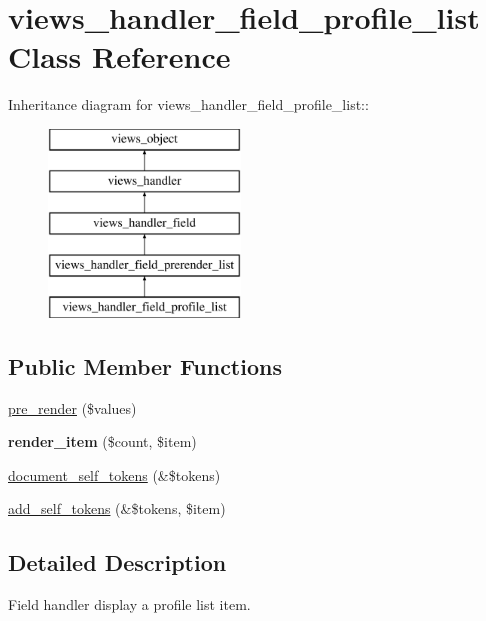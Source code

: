 \hypertarget{classviews__handler__field__profile__list}{
\section{views\_\-handler\_\-field\_\-profile\_\-list Class Reference}
\label{classviews__handler__field__profile__list}
}
Inheritance diagram for views\_\-handler\_\-field\_\-profile\_\-list::\begin{figure}[H]
\begin{center}
\leavevmode
\includegraphics[height=5cm]{classviews__handler__field__profile__list}
\end{center}
\end{figure}
\subsection*{Public Member Functions}
\begin{CompactItemize}
\item 
\hyperlink{classviews__handler__field__profile__list_8c8d3cb39336f354e35c0b2e5afd25aa}{pre\_\-render} (\$values)
\item 
\hypertarget{classviews__handler__field__profile__list_8099ba4762d6497c288efe46d804030b}{
\textbf{render\_\-item} (\$count, \$item)}
\label{classviews__handler__field__profile__list_8099ba4762d6497c288efe46d804030b}

\item 
\hyperlink{classviews__handler__field__profile__list_b3950ce980ce3c8e8ce274a25b4e3351}{document\_\-self\_\-tokens} (\&\$tokens)
\item 
\hyperlink{classviews__handler__field__profile__list_411c5238debac02e7cb3f582f7cd8e9f}{add\_\-self\_\-tokens} (\&\$tokens, \$item)
\end{CompactItemize}


\subsection{Detailed Description}
Field handler display a profile list item. 

